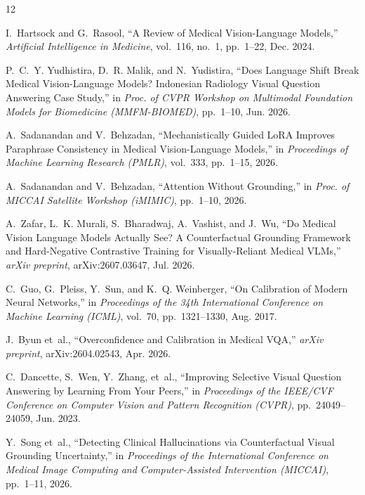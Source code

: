 \documentclass[a4paper,10pt,twoside]{article}
\begin{document}
\begin{thebibliography}{12}

I.~Hartsock and G.~Rasool, ``A Review of Medical Vision-Language Models,'' \textit{Artificial Intelligence in Medicine}, vol.~116, no.~1, pp.~1--22, Dec. 2024.

P.~C.~Y. Yudhistira, D.~R. Malik, and N.~Yudistira, ``Does Language Shift Break Medical Vision-Language Models? Indonesian Radiology Visual Question Answering Case Study,'' in \textit{Proc. of CVPR Workshop on Multimodal Foundation Models for Biomedicine (MMFM-BIOMED)}, pp.~1--10, Jun. 2026.

A.~Sadanandan and V.~Behzadan, ``Mechanistically Guided LoRA Improves Paraphrase Consistency in Medical Vision-Language Models,'' in \textit{Proceedings of Machine Learning Research (PMLR)}, vol.~333, pp.~1--15, 2026.

A.~Sadanandan and V.~Behzadan, ``Attention Without Grounding,'' in \textit{Proc. of MICCAI Satellite Workshop (iMIMIC)}, pp.~1--10, 2026.

A.~Zafar, L.~K. Murali, S.~Bharadwaj, A.~Vashist, and J.~Wu, ``Do Medical Vision Language Models Actually See? A Counterfactual Grounding Framework and Hard-Negative Contrastive Training for Visually-Reliant Medical VLMs,'' \textit{arXiv preprint}, arXiv:2607.03647, Jul. 2026.

C.~Guo, G.~Pleiss, Y.~Sun, and K.~Q. Weinberger, ``On Calibration of Modern Neural Networks,'' in \textit{Proceedings of the 34th International Conference on Machine Learning (ICML)}, vol.~70, pp.~1321--1330, Aug. 2017.

J.~Byun et~al., ``Overconfidence and Calibration in Medical VQA,'' \textit{arXiv preprint}, arXiv:2604.02543, Apr. 2026.

C.~Dancette, S.~Wen, Y.~Zhang, et~al., ``Improving Selective Visual Question Answering by Learning From Your Peers,'' in \textit{Proceedings of the IEEE/CVF Conference on Computer Vision and Pattern Recognition (CVPR)}, pp.~24049--24059, Jun. 2023.

Y.~Song et~al., ``Detecting Clinical Hallucinations via Counterfactual Visual Grounding Uncertainty,'' in \textit{Proceedings of the International Conference on Medical Image Computing and Computer-Assisted Intervention (MICCAI)}, pp.~1--11, 2026.


\end{thebibliography}
\end{document}
